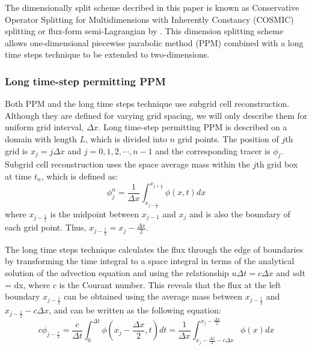 The dimensionally split scheme decribed in this paper is known as Conservative Operator Splitting for Multidimensions with Inherently Constancy (COSMIC) splitting \citep{Leonard1996} or flux-form semi-Lagrangian by \citep{Lin1996}. This dimension splitting scheme allows one-dimensional piecewise parabolic method (PPM) \citep{Colella1984} combined with a long time steps technique \citep{Leonard1995} to be extended to two-dimensions.
\subsubsection{Long time-step permitting PPM} 
\label{sec:PPM} 

Both PPM and the long time steps technique use subgrid cell reconstruction. Although they are defined for varying grid spacing, we will only describe them for uniform grid interval, $\Delta x$. Long time-step permitting PPM is described on a domain with length $L$, which is divided into $n$ grid points. The position of $j$th grid is $x_j = j\Delta x$ and $j = 0, 1, 2, \cdots, n-1$ and the corresponding tracer is $\phi_j$. Subgrid cell reconstruction uses the space average mass within the $j$th grid box at time $t_n$, which is defined as: 
\begin{equation} \label{eq:2.1} 
\phi^n_j = \frac{1}{\Delta x} \int^{x_{j+\frac{1}{2}}}_{x_{j-\frac{1}{2}}} \phi (x,t)dx
\end{equation}
where $x_{j-\frac{1}{2}}$ is the midpoint between $x_{j-1}$ and $x_{j}$ and is also the boundary of each grid point. Thus, $x_{j-\frac{1}{2}} = x_j - \frac{\Delta x}{2}$.

The long time steps technique \citep{Leonard1995} calculates the flux through the edge of boundaries by transforming the time integral to a space integral in terms of the analytical solution of the advection equation and using the relationship $u\Delta t = c\Delta x$ and $u$dt = dx, where $c$ is the Courant number. This reveals that the flux at the left boundary $x_{j-\frac{1}{2}}$ can be obtained using the average mass between $x_{j-\frac{1}{2}}$ and $x_{j-\frac{1}{2}}-c\Delta x$, and can be written as the following equation:
\begin{equation} \label{eq:2.2} 
c\phi_{j-\frac{1}{2}} = \frac{c}{\Delta t} \int^{\Delta t}_{0} \phi (x_j - \frac{\Delta x}{2}, t)dt = \frac{1}{\Delta x} \int^{x_j-\frac {\Delta x}{2}}_{x_j-\frac {\Delta x}{2}-c\Delta x} \phi (x)dx 
\end{equation} 

